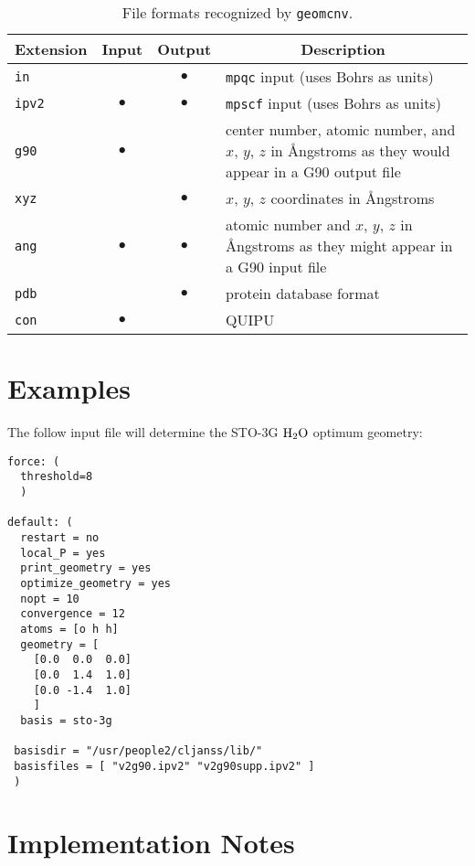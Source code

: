 \begin{table}
\centering
\begin{tabular}{|lccp{2.75in}|}
\hline
\multicolumn{1}{|c}{Extension} & \multicolumn{1}{c}{Input} &
  \multicolumn{1}{c}{Output} & \multicolumn{1}{c|}{Description} \\
\hline
{\tt in}  &           &$\bullet$  & {\tt mpqc} input (uses Bohrs as units)\\
{\tt ipv2}&$\bullet$  &$\bullet$  & {\tt mpscf} input (uses Bohrs as units)\\
{\tt g90} &$\bullet$  &           & center number, atomic number, and
                                    $x$, $y$, $z$ in \AA ngstroms as they
                                    would appear in a G90 output file\\
{\tt xyz} &           &$\bullet$  & $x$, $y$, $z$ coordinates in \AA ngstroms\\
{\tt ang} &$\bullet$  &$\bullet$  & atomic number and $x$, $y$, $z$ in
                                    \AA ngstroms as they might appear
                                    in a G90 input file\\
{\tt pdb} &           &$\bullet$  & protein database format \\
{\tt con} &$\bullet$  &           & QUIPU \\
\hline
\end{tabular}
\caption{File formats recognized by {\tt geomcnv}.}
\label{geomcnvtab}
\end{table}

\section{Examples}
The follow input file will determine the STO-3G ${\rm H}_2{\rm O}$
optimum geometry:
\begin{verbatim}
force: (
  threshold=8
  )

default: (
  restart = no
  local_P = yes
  print_geometry = yes
  optimize_geometry = yes
  nopt = 10
  convergence = 12
  atoms = [o h h]
  geometry = [
    [0.0  0.0  0.0]
    [0.0  1.4  1.0]
    [0.0 -1.4  1.0]
    ]
  basis = sto-3g

 basisdir = "/usr/people2/cljanss/lib/"
 basisfiles = [ "v2g90.ipv2" "v2g90supp.ipv2" ]
 )
\end{verbatim}

\section{Implementation Notes}
\label{implementation}

